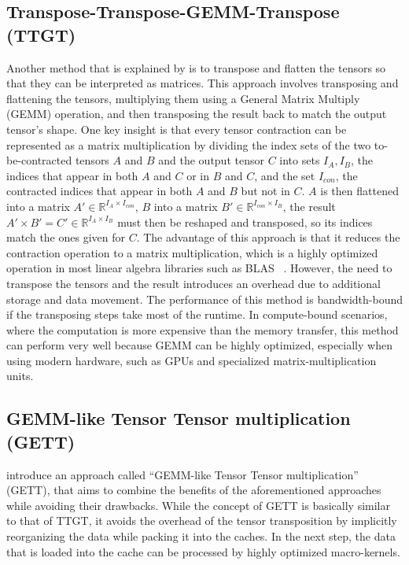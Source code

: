 \subsection{Transpose-Transpose-GEMM-Transpose (TTGT)}
Another method that is explained by \textcite{springer} is to transpose and flatten the tensors so that they can be interpreted as matrices. This approach involves transposing and flattening the tensors, multiplying them using a General Matrix Multiply (GEMM) operation, and then transposing the result back to match the output tensor's shape. 
One key insight is that every tensor contraction can be represented as a matrix multiplication by dividing the index sets of the two to-be-contracted tensors $A$ and $B$ and the output tensor $C$ into sets $I_A, I_B$, the indices that appear in both $A$ and $C$ or in $B$ and $C$, and the set $I_{con}$, the contracted indices that appear in both $A$ and $B$ but not in $C$. $A$ is then flattened into a matrix $A' \in \mathbb{R}^{I_A\times I_{con}}$, $B$ into a matrix $B' \in \mathbb{R}^{I_{con} \times I_B}$, the result $A'\times B' = C' \in \mathbb{R}^{I_A\times I_B}$ must then be reshaped and transposed, so its indices match the ones given for $C$.
The advantage of this approach is that it reduces the contraction operation to a matrix multiplication, which is a highly optimized operation in most linear algebra libraries such as BLAS ~\cite{BLAS}. However, the need to transpose the tensors and the result introduces an overhead due to additional storage and data movement. The performance of this method is bandwidth-bound if the transposing steps take most of the runtime. In compute-bound scenarios, where the computation is more expensive than the memory transfer, this method can perform very well because GEMM can be highly optimized, especially when using modern hardware, such as GPUs and specialized matrix-multiplication units.

\subsection{GEMM-like Tensor Tensor multiplication (GETT)}\label{gemm}
\noindent \textcite{springer} introduce an approach called ``GEMM-like Tensor Tensor multiplication'' (GETT), that aims to combine the benefits of the aforementioned approaches while avoiding their drawbacks. 
While the concept of GETT is basically similar to that of TTGT, it avoids the overhead of the tensor transposition by implicitly reorganizing the data while packing it into the caches. In the next step, the data that is loaded into the cache can be processed by highly optimized macro-kernels.

